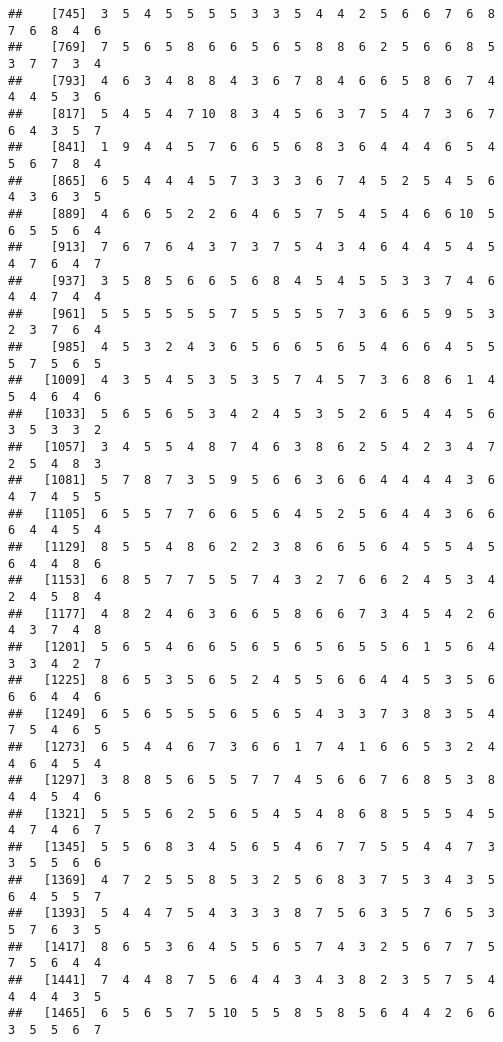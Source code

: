 \documentclass[
]{book}
\begin{document}
\begin{verbatim}
##    [745]  3  5  4  5  5  5  5  3  3  5  4  4  2  5  6  6  7  6  8  7  6  8  4  6
##    [769]  7  5  6  5  8  6  6  5  6  5  8  8  6  2  5  6  6  8  5  3  7  7  3  4
##    [793]  4  6  3  4  8  8  4  3  6  7  8  4  6  6  5  8  6  7  4  4  4  5  3  6
##    [817]  5  4  5  4  7 10  8  3  4  5  6  3  7  5  4  7  3  6  7  6  4  3  5  7
##    [841]  1  9  4  4  5  7  6  6  5  6  8  3  6  4  4  4  6  5  4  5  6  7  8  4
##    [865]  6  5  4  4  4  5  7  3  3  3  6  7  4  5  2  5  4  5  6  4  3  6  3  5
##    [889]  4  6  6  5  2  2  6  4  6  5  7  5  4  5  4  6  6 10  5  6  5  5  6  4
##    [913]  7  6  7  6  4  3  7  3  7  5  4  3  4  6  4  4  5  4  5  4  7  6  4  7
##    [937]  3  5  8  5  6  6  5  6  8  4  5  4  5  5  3  3  7  4  6  4  4  7  4  4
##    [961]  5  5  5  5  5  5  7  5  5  5  5  7  3  6  6  5  9  5  3  2  3  7  6  4
##    [985]  4  5  3  2  4  3  6  5  6  6  5  6  5  4  6  6  4  5  5  5  7  5  6  5
##   [1009]  4  3  5  4  5  3  5  3  5  7  4  5  7  3  6  8  6  1  4  5  4  6  4  6
##   [1033]  5  6  5  6  5  3  4  2  4  5  3  5  2  6  5  4  4  5  6  3  5  3  3  2
##   [1057]  3  4  5  5  4  8  7  4  6  3  8  6  2  5  4  2  3  4  7  2  5  4  8  3
##   [1081]  5  7  8  7  3  5  9  5  6  6  3  6  6  4  4  4  4  3  6  4  7  4  5  5
##   [1105]  6  5  5  7  7  6  6  5  6  4  5  2  5  6  4  4  3  6  6  6  4  4  5  4
##   [1129]  8  5  5  4  8  6  2  2  3  8  6  6  5  6  4  5  5  4  5  6  4  4  8  6
##   [1153]  6  8  5  7  7  5  5  7  4  3  2  7  6  6  2  4  5  3  4  2  4  5  8  4
##   [1177]  4  8  2  4  6  3  6  6  5  8  6  6  7  3  4  5  4  2  6  4  3  7  4  8
##   [1201]  5  6  5  4  6  6  5  6  5  6  5  6  5  5  6  1  5  6  4  3  3  4  2  7
##   [1225]  8  6  5  3  5  6  5  2  4  5  5  6  6  4  4  5  3  5  6  6  6  4  4  6
##   [1249]  6  5  6  5  5  5  6  5  6  5  4  3  3  7  3  8  3  5  4  7  5  4  6  5
##   [1273]  6  5  4  4  6  7  3  6  6  1  7  4  1  6  6  5  3  2  4  4  6  4  5  4
##   [1297]  3  8  8  5  6  5  5  7  7  4  5  6  6  7  6  8  5  3  8  4  4  5  4  6
##   [1321]  5  5  5  6  2  5  6  5  4  5  4  8  6  8  5  5  5  4  5  4  7  4  6  7
##   [1345]  5  5  6  8  3  4  5  6  5  4  6  7  7  5  5  4  4  7  3  3  5  5  6  6
##   [1369]  4  7  2  5  5  8  5  3  2  5  6  8  3  7  5  3  4  3  5  6  4  5  5  7
##   [1393]  5  4  4  7  5  4  3  3  3  8  7  5  6  3  5  7  6  5  3  5  7  6  3  5
##   [1417]  8  6  5  3  6  4  5  5  6  5  7  4  3  2  5  6  7  7  5  7  5  6  4  4
##   [1441]  7  4  4  8  7  5  6  4  4  3  4  3  8  2  3  5  7  5  4  4  4  4  3  5
##   [1465]  6  5  6  5  7  5 10  5  5  8  5  8  5  6  4  4  2  6  6  3  5  5  6  7

\end{verbatim}
\end{document}
